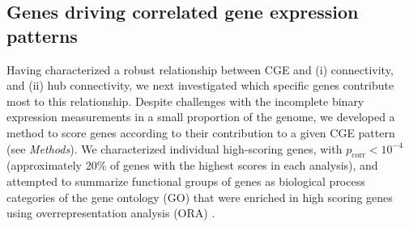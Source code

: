 \documentclass[10pt,letterpaper]{article}
\begin{document}
{\subsection*{Genes driving correlated gene expression patterns}
Having characterized a robust relationship between CGE and (i) connectivity, and (ii) hub connectivity, we next investigated which specific genes contribute most to this relationship.
Despite challenges with the incomplete binary expression measurements in a small proportion of the genome, we developed a method to score genes according to their contribution to a given CGE pattern (see \emph{Methods}).
We characterized individual high-scoring genes, with $p_\mathrm{corr} < 10^{-4}$ (approximately 20\% of genes with the highest scores in each analysis), and attempted to summarize functional groups of genes as biological process categories of the gene ontology (GO) that were enriched in high scoring genes using overrepresentation analysis (ORA) \cite{Ashburner2000, Gillis2010}.

}
\end{document}

